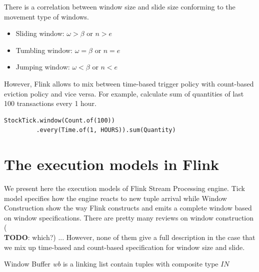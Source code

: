 There is a correlation between window size and slide size  conforming to the movement type of windows.
\begin{itemize}
\item Sliding window: $\omega > \beta$ or $n > e$
\item Tumbling window: $\omega = \beta$ or $n = e$
\item Jumping window: $\omega < \beta$ or $n < e$
\end{itemize}

However, Flink allows to mix between time-based trigger policy with count-based eviction policy and vice versa. For example,
calculate sum of quantities of last 100 transactions every 1 hour.
\begin{verbatim}
StockTick.window(Count.of(100))
		 .every(Time.of(1, HOURS)).sum(Quantity)
\end{verbatim}

\section{The execution models in Flink}
We present here the execution models of Flink Stream Processing engine. Tick model specifies how the engine reacts to new tuple arrival while Window Construction show the way Flink constructs and emits a complete window based on window specifications. There are pretty many reviews on window construction (\textbf{\\TODO}: which?) ... However, none of them give a full description in the case that we mix up time-based and count-based specification for window size and slide.  


%
%
%
%
%

Window Buffer \textit{wb} is a linking list contain tuples with composite type $IN$




